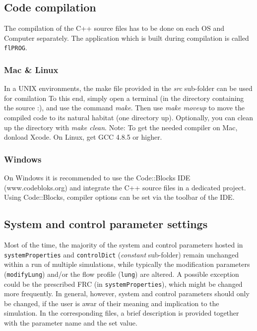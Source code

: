 \subsection{Code compilation} \label{ssec:code_compilation}
The compilation of the C++ source files has to be done on each OS and Computer separately.
The application which is built during compilation is called \texttt{flPROG}.

\subsubsection{Mac \& Linux}
In a UNIX environments, the make file provided in the \textit{src} sub-folder can be used for comilation
To this end, simply open a terminal (in the directory containing the source :), and use the command \textit{make}.
Then use \textit{make moveup} to move the compiled code to its natural habitat (one directory up).
Optionally, you can clean up the directory with \textit{make clean}.
Note: To get the needed compiler on Mac, donload Xcode. On Linux, get GCC 4.8.5 or higher.

\subsubsection{Windows}
On Windows it is recommended to use the Code::Blocks IDE (www.codebloks.org) and integrate the C++ source files in a dedicated project.
Using Code::Blocks, compiler options can be set via the toolbar of the IDE.


\subsection{System and control parameter settings} \label{ssec:parameter_settingss}
Most of the time, the majority of the system and control parameters hosted in \texttt{systemProperties} and \texttt{controlDict} (\textit{constant} sub-folder) remain unchanged within a run of multiple simulations, while typically the modification parameters (\texttt{modifyLung}) and/or the flow profile (\texttt{lung}) are altered.
A possible exception could be the prescribed FRC (in \texttt{systemProperties}), which might be changed more frequently.
In general, however, system and control parameters should only be changed, if the user is awar of their meaning and implication to the simulation.
In the corresponding files, a brief description is provided together with the parameter name and the set value.


